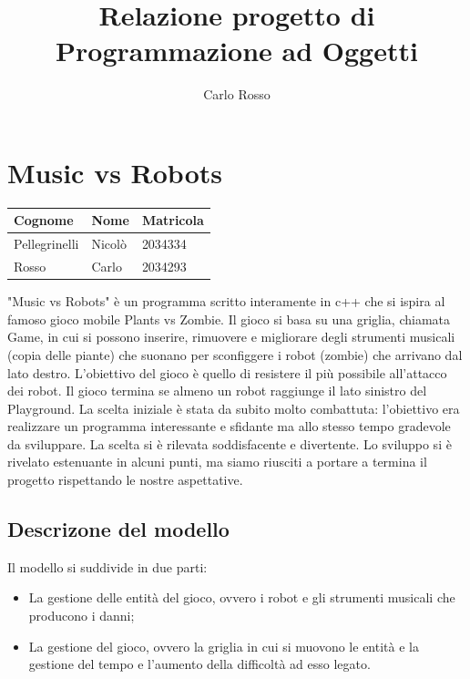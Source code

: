 \documentclass[11pt]{article}
\title{Relazione progetto di Programmazione ad Oggetti}
\author{Carlo Rosso}
\begin{document}
\section{Music vs Robots}

\begin{table}[ht]
	\begin{tabular}{|l|l|l|}
		\hline
		\textbf{Cognome} & \textbf{Nome} & \textbf{Matricola} \\ \hline
		Pellegrinelli & Nicolò & 2034334 \\ \hline
		Rosso & Carlo & 2034293 \\ \hline
	\end{tabular}
\end{table}

"Music vs Robots" è un programma scritto interamente in c++ che si ispira al 
famoso gioco mobile Plants vs Zombie.
Il gioco si basa su una griglia, chiamata Game, in cui si possono 
inserire, rimuovere e migliorare degli strumenti musicali (copia delle piante) 
che suonano per sconfiggere i robot (zombie) che arrivano dal lato destro.
L’obiettivo del gioco è quello di resistere il più possibile all’attacco dei 
robot. Il gioco termina se almeno un robot raggiunge il lato sinistro del 
Playground.
La scelta iniziale è stata da subito molto combattuta: l’obiettivo era 
realizzare un programma interessante e sfidante ma allo stesso tempo gradevole
da sviluppare.
La scelta si è rilevata soddisfacente e divertente. Lo sviluppo si è rivelato
estenuante in alcuni punti, ma siamo riusciti a portare a termina il progetto
rispettando le nostre aspettative.

\subsection{Descrizone del modello}

Il modello si suddivide in due parti:
\begin{itemize}
	\item La gestione delle entità del gioco, ovvero i robot e gli strumenti
		musicali che producono i danni;

	\item La gestione del gioco, ovvero la griglia in cui si muovono le entità
		e la gestione del tempo e l'aumento della difficoltà ad esso legato.
\end{itemize}
\end{document}
